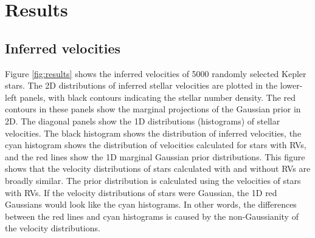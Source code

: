 \section{Results}
\label{sec:results}

\subsection{Inferred velocities}

Figure \ref{fig:results} shows the inferred velocities of 5000 randomly
selected Kepler stars.
The 2D distributions of inferred stellar velocities are plotted in the
lower-left panels, with black contours indicating the stellar number density.
The red contours in these panels show the marginal projections of the
Gaussian prior in 2D.
The diagonal panels show the 1D distributions (histograms) of stellar
velocities.
The black histogram shows the distribution of inferred velocities, the cyan
histogram shows the distribution of velocities calculated for stars with RVs,
and the red lines show the 1D marginal Gaussian prior distributions.
This figure shows that the velocity distributions of stars calculated with and
without RVs are broadly similar.
The prior distribution is calculated using the velocities of stars with RVs.
If the velocity distributions of stars were Gaussian, the 1D red Gaussians
would look like the cyan histograms.
In other words, the differences between the red lines and cyan histograms
is caused by the non-Gaussianity of the velocity distributions.


